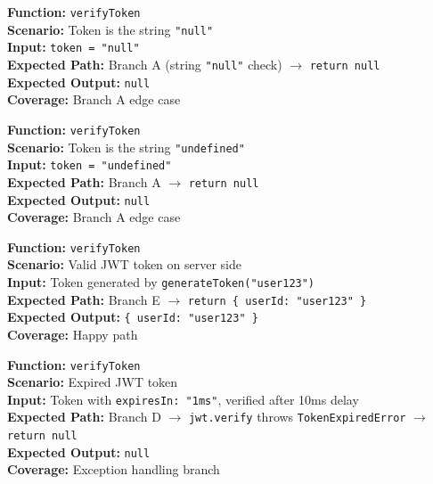 \documentclass[12pt,a4paper]{report}
\newcommand{\pone}{\textbf{\color{p1red}P1}}
\begin{document}
\begin{tcolorbox}[testbox, title={AUTH-002 \hfill \pone}]
\textbf{Function:} \texttt{verifyToken} \\
\textbf{Scenario:} Token is the string \texttt{"null"} \\
\textbf{Input:} \texttt{token = "null"} \\
\textbf{Expected Path:} Branch A (string \texttt{"null"} check) $\to$ \texttt{return null} \\
\textbf{Expected Output:} \texttt{null} \\
\textbf{Coverage:} Branch A edge case
\end{tcolorbox}

\begin{tcolorbox}[testbox, title={AUTH-003 \hfill \pone}]
\textbf{Function:} \texttt{verifyToken} \\
\textbf{Scenario:} Token is the string \texttt{"undefined"} \\
\textbf{Input:} \texttt{token = "undefined"} \\
\textbf{Expected Path:} Branch A $\to$ \texttt{return null} \\
\textbf{Expected Output:} \texttt{null} \\
\textbf{Coverage:} Branch A edge case
\end{tcolorbox}

\begin{tcolorbox}[testbox, title={AUTH-004 \hfill \pone}]
\textbf{Function:} \texttt{verifyToken} \\
\textbf{Scenario:} Valid JWT token on server side \\
\textbf{Input:} Token generated by \texttt{generateToken("user123")} \\
\textbf{Expected Path:} Branch E $\to$ \texttt{return \{ userId: "user123" \}} \\
\textbf{Expected Output:} \texttt{\{ userId: "user123" \}} \\
\textbf{Coverage:} Happy path
\end{tcolorbox}

\begin{tcolorbox}[criticalbox, title={AUTH-005 \hfill \pone\ --- Expired Token}]
\textbf{Function:} \texttt{verifyToken} \\
\textbf{Scenario:} Expired JWT token \\
\textbf{Input:} Token with \texttt{expiresIn: "1ms"}, verified after 10ms delay \\
\textbf{Expected Path:} Branch D $\to$ \texttt{jwt.verify} throws \texttt{TokenExpiredError} $\to$ \texttt{return null} \\
\textbf{Expected Output:} \texttt{null} \\
\textbf{Coverage:} Exception handling branch
\end{tcolorbox}
\end{document}
